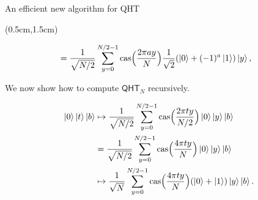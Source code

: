 \documentclass{beamer}
\theoremstyle{definition}
\newcommand{\cas}{\mathrm{cas}}
\newcommand{\qht}{\mathsf{QHT}}
\begin{document}
\begin{frame}{An efficient new algorithm for QHT}
    
    \begin{textblock*}{12cm}(0.5cm,1.5cm)
       
        \begin{align}
            & = \frac{1}{\sqrt{N / 2}} \sum_{y = 0}^{N / 2 - 1} \cas\Big( \frac{2\pi a y}{N} \Big) \frac{1}{\sqrt{2}} (\ket{0} + (-1)^a \ket{1}) \ket{y}, \label{eq:qht-alt} 
        \end{align}

        We now show how to compute $\qht_N$ recursively.

        \begin{align*}
            \ket{0}\ket{t}\ket{b}
            & \mapsto \frac{1}{\sqrt{N / 2}} \sum_{y = 0}^{N / 2 - 1} \cas\Big( \frac{2\pi t y}{N / 2} \Big) \ket{0} \ket{y} \ket{b} \\%
            & = \frac{1}{\sqrt{N / 2}} \sum_{y = 0}^{N / 2 - 1} \cas\Big( \frac{4\pi t y}{N} \Big) \ket{0} \ket{y} \ket{b} \\
            & \mapsto \frac{1}{\sqrt{N}} \sum_{y = 0}^{N / 2 - 1} \cas\Big( \frac{4\pi t y}{N} \Big) (\ket{0} + \ket{1}) \ket{y}\ket{b}. %
        \end{align*}
        
    \end{textblock*}
    
\end{frame}



    
       
\end{document}
